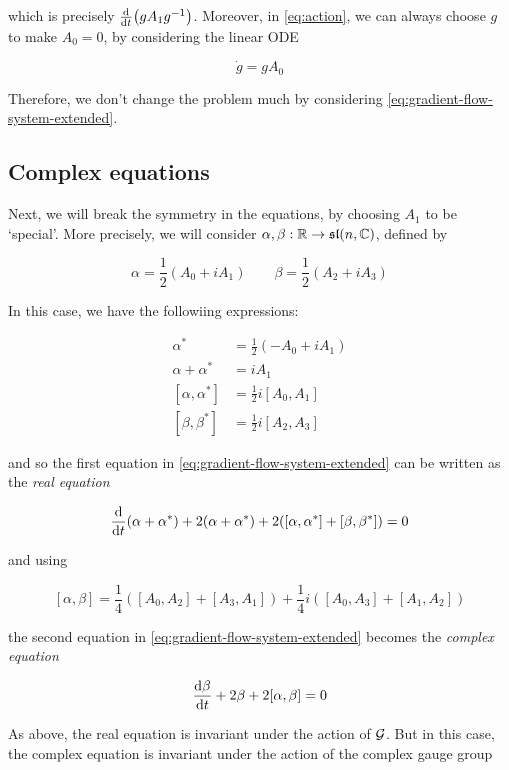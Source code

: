 \documentclass{report}
\renewcommand{\sl}{\mathfrak{sl}}
\begin{document}
which is precisely \(\dv{t}(gA_1g^{-1})\). Moreover, in \cref{eq:action}, we can always choose \(g\) to make \(A_0 = 0\), by considering the linear ODE

\[\dot g = gA_0\]

Therefore, we don't change the problem much by considering \cref{eq:gradient-flow-system-extended}. 

\subsection{Complex equations}

Next, we will break the symmetry in the equations, by choosing \(A_1\) to be `special'. More precisely, we will consider \(\alpha, \beta : \R \to \sl(n, \C)\), defined by

\[\alpha = \frac{1}{2}(A_0 + iA_1) \qquad \beta = \frac{1}{2}(A_2 + iA_3)\]

In this case, we have the followiing expressions:

\begin{align*}
    \alpha^* &= \frac{1}{2}(-A_0 + iA_1) \\
    \alpha + \alpha^* &= iA_1 \\
    [\alpha, \alpha^*] &= \frac12i[A_0, A_1] \\
    [\beta, \beta^*] &= \frac12i[A_2, A_3]
\end{align*}

and so the first equation in \cref{eq:gradient-flow-system-extended} can be written as the \emph{real equation}

\begin{equation}
    \label{eq:real-equation}
    \dv{t}(\alpha + \alpha^*) + 2(\alpha + \alpha^*) + 2([\alpha, \alpha^*] + [\beta, \beta^*]) = 0
\end{equation}

and using

\[[\alpha, \beta] = \frac14\left([A_0, A_2] + [A_3, A_1]\right) + \frac14i\left([A_0, A_3] + [A_1, A_2]\right)\]

the second equation in \cref{eq:gradient-flow-system-extended} becomes the \emph{complex equation}

\begin{equation}
    \label{eq:complex-equation}
    \dv{\beta}{t} + 2\beta + 2[\alpha, \beta] = 0
\end{equation}

As above, the real equation is invariant under the action of \(\mathcal{G}\). But in this case, the complex equation is invariant under the action of the complex gauge group
\end{document}
